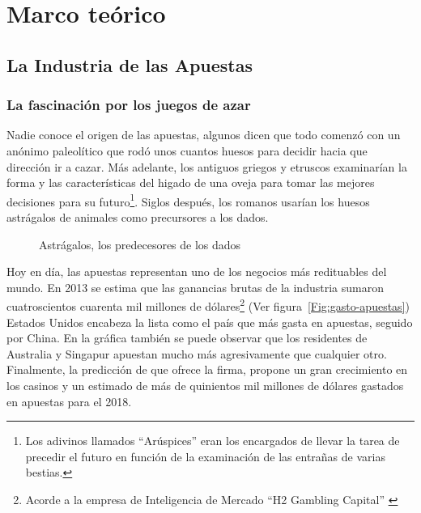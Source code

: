 \graphicspath{{/Users/brunomedina/Dropbox/Tesis-Egobets/egobets-notas/resources/marco/}}
\chapter{Marco teórico}
\section{La Industria de las Apuestas}
\subsection{La fascinación por los juegos de azar}

Nadie conoce el origen de las apuestas, algunos dicen que todo comenzó con un anónimo paleolítico que rodó unos cuantos huesos para decidir hacia que dirección ir a cazar. Más adelante, los antiguos griegos y etruscos examinarían la forma y  las características del higado de una oveja para tomar las mejores decisiones para su futuro\footnote{Los adivinos llamados ``Arúspices'' eran los encargados de llevar la tarea de precedir el futuro en función de la examinación de las entrañas de varias bestias.}. Siglos después, los romanos usarían los huesos astrágalos de animales como precursores a los dados. \cite{schwartz2013roll}

\begin{figure}[!htb]\centering
   \begin {minipage}{0.85\textwidth}
     \caption{Astrágalos, los predecesores de los dados}\label{Fig:huesos}
   \end{minipage}
\end{figure}

Hoy en día, las apuestas representan uno de los negocios más redituables del mundo. En 2013 se estima que las ganancias brutas de la industria sumaron cuatroscientos cuarenta mil millones de dólares\footnote{Acorde a la empresa de Inteligencia de Mercado ``H2 Gambling Capital'' \cite{economistHouseWins}} (Ver figura~\ref{Fig:gasto-apuestas}) Estados Unidos encabeza la lista como el país que más gasta en apuestas, seguido por China. En la gráfica también se puede observar que los residentes de Australia y Singapur apuestan mucho más agresivamente que cualquier otro. Finalmente, la predicción de que ofrece la firma, propone un gran crecimiento en los casinos y un estimado de más de quinientos mil millones de dólares gastados en apuestas para el 2018.


